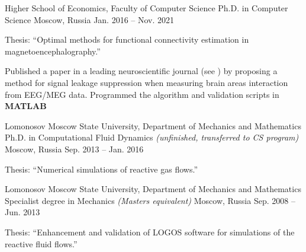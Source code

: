 \begin{cventries}
  \cventry
    {Higher School of Economics, Faculty of Computer Science}
    {Ph.D. in Computer Science}
    {Moscow, Russia}
    {Jan. 2016 -- Nov. 2021}
    {
      \begin{cvitems}
        \item {Thesis: ``Optimal methods for functional connectivity estimation in magnetoencephalography.''}
      \item{Published a paper in a leading neuroscientific journal (see \cite{psiicos}})
          by proposing a method for signal leakage suppression when measuring brain areas interaction from EEG/MEG data. Programmed the algorithm and validation scripts in \textbf{MATLAB}
      \end{cvitems}
    }
  \cventry
    {Lomonosov Moscow State University, Department of Mechanics and Mathematics}
    {Ph.D. in Computational Fluid Dynamics \emph{(unfinished, transferred to CS program)}}
    {Moscow, Russia}
    {Sep. 2013 --  Jan. 2016}
    {
      \begin{cvitems}
        \item {Thesis: ``Numerical simulations of reactive gas flows.''}
      \end{cvitems}
    }
  \cventry
    {Lomonosov Moscow State University, Department of Mechanics and Mathematics}
{Specialist degree in Mechanics \emph{(Masters equivalent)}}
    {Moscow, Russia}
    {Sep. 2008 -- Jun. 2013}
    {
      \begin{cvitems}
        \item{Thesis: ``Enhancement and validation of LOGOS software for simulations of the reactive fluid flows.''}
      \end{cvitems}
    }
\end{cventries}
